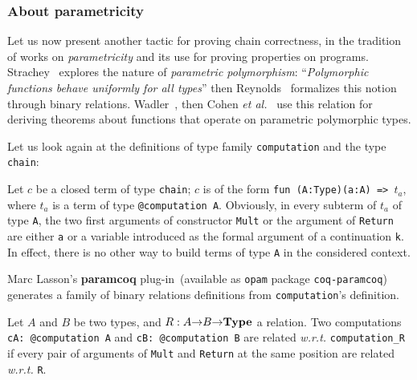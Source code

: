 


\subsubsection{About parametricity}
Let us now present another tactic for proving chain correctness,
in the tradition of works on \emph{parametricity} and its use for 
proving properties on programs.
Strachey~\cite{Strachey:2000:FCP:609150.609208}
explores the nature of \emph{parametric
polymorphism}: ``\emph{Polymorphic functions behave uniformly for all types}''
then Reynolds~\cite{REYNOLDS83} formalizes this notion through binary relations.
Wadler~\cite{Wadler1989}, then Cohen \emph{et al.}~\cite{Cohen2013}
use this relation for deriving
 theorems about functions that operate on parametric
polymorphic types.

Let us look again at the definitions of type family \texttt{computation}
and the type \texttt{chain}:


Let $c$ be a closed term of type 
\texttt{chain}; $c$ is  of the form \linebreak
\texttt{fun (A:Type)(a:A) => $t_a$}, where $t_a$ is a term of type
\texttt{@computation A}.
\label{obvious-remark}
Obviously,  in every subterm of {$t_a$} of type \texttt{A}, 
the two first arguments of constructor \texttt{Mult} or the
argument of \texttt{Return} are either \texttt{a} or a variable 
introduced as the formal argument of a continuation \texttt{k}.
In effect, there is no other way to build terms of type \texttt{A} in the considered context.


Marc Lasson's \textbf{paramcoq} plug-in~(available as  \texttt{opam} package 
\texttt{coq-paramcoq}) generates  a family of binary relations definitions
from \texttt{computation}'s definition.

\pagebreak




Let $A$ and $B$  be two types, and $R: A \mbox{$\rightarrow$} B \mbox{$\rightarrow$} \textbf{Type}$ 
a relation.
Two computations \texttt{cA: @computation A} and \texttt{cB: @computation B}
are related \emph{w.r.t.} \texttt{computation\_R} if every pair of 
arguments of \texttt{Mult} and \texttt{Return} at the same position 
are related \emph{w.r.t.} \texttt{R}.


